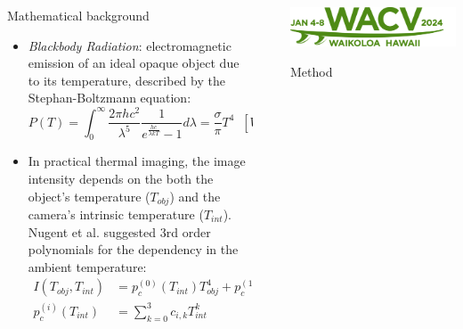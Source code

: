 \documentclass[final]{beamer}
\newlength{\sepwidth}
\newlength{\colwidth}
\newcommand{\separatorcolumn}{\begin{column}{\sepwidth}\end{column}}
\begin{document}
\begin{frame}[t]
\begin{columns}[t]
\begin{column}{\colwidth}
  \begin{exampleblock}{Mathematical background}
    \begin{itemize}
      \item \emph{Blackbody Radiation}: electromagnetic emission of an ideal opaque object due to its temperature, described by the Stephan-Boltzmann equation:
            \begin{equation*} \label{eq:stephan-boltzmann-ideal}
                P(T) = \int_0^\infty \frac{2\pi hc^2}{\lambda^5}\frac{1}{e^{\frac{hc}{\lambda kT}} - 1} d\lambda = \frac{\sigma}{\pi} T^4 \; \; \left[W sr^{-1} m^{-2}\right]
            \end{equation*}
      \item In practical thermal imaging, the image intensity depends on the both the object's temperature ($T_\mathit{obj}$) and the camera's intrinsic temperature ($T_\mathit{int}$). 
            Nugent et al. \cite{10.1117/1.OE.52.6.061304} suggested 3rd order polynomials for the dependency in the ambient temperature:
            \begin{equation*} \label{eq:IntensityVsTemperatures}
              \begin{split}            
                I(T_\mathit{obj}, T_\mathit{int}) &= p^{(0)}_c(T_\mathit{int}) T^4_\mathit{obj} + p^{(1)}_c(T_\mathit{int})\\
                p^{(i)}_c(T_\mathit{int}) &= \sum_{k=0}^3  c_{i,k} T_\mathit{int}^k
            \end{split}
            \end{equation*}
    \end{itemize}
  \end{exampleblock}

\end{column}

\separatorcolumn

\begin{column}{\colwidth}

  \centering\includegraphics[width=0.75\linewidth]{../figs/logos/WACV-Logo_2024_dgreen.png}
  \vspace{0.85cm}
  \begin{alertblock}{Method}


\end{alertblock}
\end{column}
\end{columns}
\end{frame}
\end{document}
